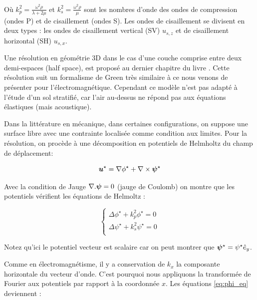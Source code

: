 Où $k_p^2 = \frac{\omega^2\rho}{\lambda+2\mu}$ et $k_s^2 = \frac{\omega^2\rho}{\mu}$ sont les nombres d'onde des ondes de compression (ondes P) et de cisaillement (ondes S). Les ondes de cisaillement se divisent en deux types : les ondes de cisaillement vertical (SV) $u_{s,z}$ et de cisaillement horizontal (SH) $u_{s,x}$.\par

Une résolution en géométrie 3D dans le cas d'une couche comprise entre deux demi-espaces (half space), est proposé au dernier chapitre du livre \cite{Chew2022}. Cette résolution suit un formalisme de Green très similaire à ce nous venons de présenter pour l'électromagnétique. Cependant ce modèle n'est pas adapté à l'étude d'un sol stratifié, car l'air au-dessus ne répond pas aux équations élastiques (mais acoustique). \par 

Dans la littérature en mécanique, dans certaines configurations, on suppose une surface libre avec une contrainte localisée comme condition aux limites. Pour la résolution, on procède à une décomposition en potentiels de Helmholtz du champ de déplacement: \par

\begin{equation}
    \bm{u}^\star = \nabla \phi^\star + \nabla \times \bm{\psi}^\star
\end{equation}

Avec la condition de Jauge $\nabla.\bm{\psi} = 0$ (jauge de Coulomb) on montre que les potentiels vérifient les équations de Helmoltz \cite{JONES}: 

\begin{equation}
    \begin{cases}
         \Delta \phi^\star    + k_p^2 \phi^\star    = 0 \\
         \Delta \psi^\star    + k_s^2 \psi^\star   = 0 \\
    \end{cases}
    \label{eq:phi_eq}
\end{equation}

Notez qu'ici le potentiel vecteur est scalaire car on peut montrer que $\bm{\psi}^\star = \psi^\star \hat{e}_y$.\par 

Comme en électromagnétisme, il y a conservation de $k_x$ la composante horizontale du vecteur d'onde. C'est pourquoi nous appliquons la transformée de Fourier aux potentiels par rapport à la coordonnée $x$. Les équations \eqref{eq:phi_eq} deviennent \cite{JONES}:

